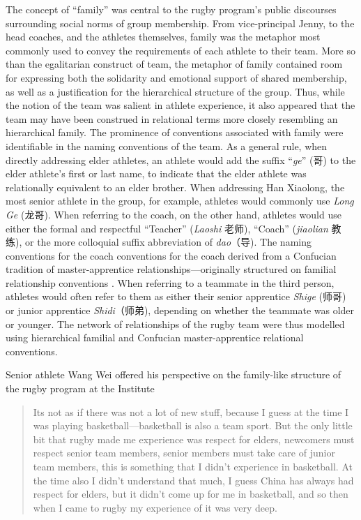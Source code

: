 \begin{CJK}{UTF8}{gbsn}
The concept of ``family'' was central to the rugby program's public discourses surrounding social norms of group membership.
From vice-principal Jenny, to the head coaches, and the athletes themselves, family was the metaphor most commonly used to convey the requirements of each athlete to their team.  More so than the egalitarian construct of team, the metaphor of family contained room for expressing both the solidarity and emotional support of shared membership, as well as a justification for the hierarchical structure of the group.  Thus, while the notion of the team was salient in athlete experience, it also appeared that the team may have been construed in relational terms more closely resembling an hierarchical family.  The prominence of conventions associated with family were identifiable in the naming conventions of the team.  As a general rule, when directly addressing elder athletes, an athlete would add the suffix ``\textit{ge}'' (哥) to the elder athlete's first or last name, to indicate that the elder athlete was relationally equivalent to an elder brother.  When addressing Han Xiaolong, the most senior athlete in the group, for example, athletes would commonly use \textit{Long Ge} (龙哥).  When referring to the coach, on the other hand, athletes would use either the formal and respectful ``Teacher'' (\textit{Laoshi} 老师), ``Coach'' (\textit{jiaolian} 教练), or the more colloquial suffix abbreviation of \textit{dao}（导).  The naming conventions for the coach conventions for the coach derived from a Confucian tradition of master-apprentice relationships---originally structured on familial relationship conventions \citep{Spence1990}.
When referring to a teammate in the third person, athletes would often refer to them as either their senior apprentice \textit{Shige} (师哥) or junior apprentice \textit{Shidi}（师弟), depending on whether the teammate was older or younger.  The network of relationships of the rugby team were thus modelled using hierarchical familial and Confucian master-apprentice relational conventions.

Senior athlete Wang Wei offered his perspective on the family-like structure of the rugby program at the Institute

    \begin{quote}
      Its not as if there was not a lot of new stuff, because I guess at the time I was playing basketball---basketball is also a team sport.  But the only little bit that rugby made me experience was respect for elders, newcomers must respect senior team members, senior members must take care of junior team members, this is something that I didn't experience in basketball.  At the time also I didn't understand that much, I guess China has always had respect for elders, but it didn't come up for me in basketball, and so then when I came to rugby my experience of it was very deep.
    \end{quote}


\end{CJK}
